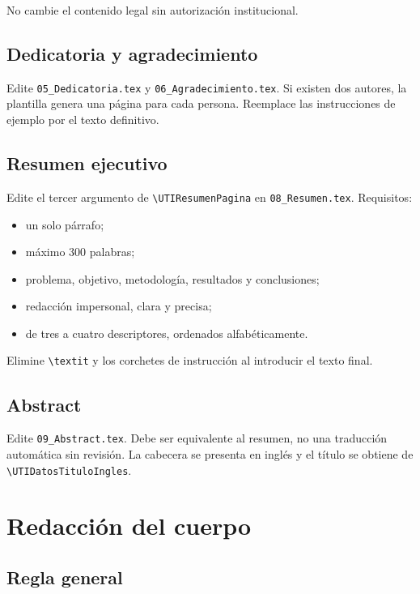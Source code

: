\documentclass[12pt,a4paper,oneside]{report}
\begin{document}
No cambie el contenido legal sin autorización institucional.

\section{Dedicatoria y agradecimiento}

Edite \texttt{05\_Dedicatoria.tex} y \texttt{06\_Agradecimiento.tex}. Si existen dos autores, la plantilla genera una página para cada persona. Reemplace las instrucciones de ejemplo por el texto definitivo.

\section{Resumen ejecutivo}

Edite el tercer argumento de \texttt{\textbackslash UTIResumenPagina} en \texttt{08\_Resumen.tex}. Requisitos:

\begin{itemize}
  \item un solo párrafo;
  \item máximo 300 palabras;
  \item problema, objetivo, metodología, resultados y conclusiones;
  \item redacción impersonal, clara y precisa;
  \item de tres a cuatro descriptores, ordenados alfabéticamente.
\end{itemize}

Elimine \texttt{\textbackslash textit} y los corchetes de instrucción al introducir el texto final.

\section{Abstract}

Edite \texttt{09\_Abstract.tex}. Debe ser equivalente al resumen, no una traducción automática sin revisión. La cabecera se presenta en inglés y el título se obtiene de \texttt{\textbackslash UTIDatosTituloIngles}.

\chapter{Redacción del cuerpo}

\section{Regla general}
\end{document}
